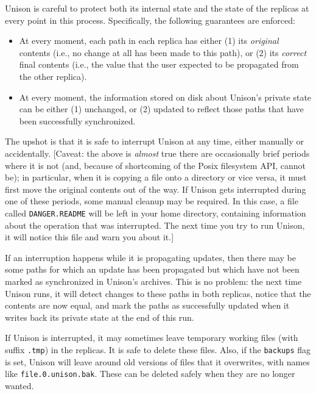 \documentclass{article}
\begin{document}

Unison is careful to protect both its internal state and the state of
the replicas at every point in this process.  Specifically, the
following guarantees are enforced:
\begin{itemize}
\item At every moment, each path in each replica has either (1) its {\em
  original} contents (i.e., no change at all has been made to this
path), or (2) its {\em correct} final contents (i.e., the value that the
user expected to be propagated from the other replica).
\item At every moment, the information stored on disk about Unison's
private state can be either (1) unchanged, or (2) updated to reflect
those paths that have been successfully synchronized.
\end{itemize}
The upshot is that it is safe to interrupt Unison at any time, either
manually or accidentally.  [Caveat: the above is {\em almost} true there
are occasionally brief periods where it is not (and, because of
shortcoming of the Posix filesystem API, cannot be); in particular, when
it is copying a file onto a directory or vice versa, it must first move
the original contents out of the way.  If Unison gets
interrupted during one of these periods, some manual cleanup may be
required.  In this case, a file called {\tt DANGER.README} will be left
in your home directory, containing information about the operation that
was interrupted. The next time you try to run Unison, it will notice this
file and warn you about it.]

If an interruption happens while it is propagating updates, then there
may be some paths for which an update has been propagated but which
have not been marked as synchronized in Unison's archives.  This is no
problem: the next time Unison runs, it will detect changes to these
paths in both replicas, notice that the contents are now equal, and
mark the paths as successfully updated when it writes back its private
state at the end of this run.

If Unison is interrupted, it may sometimes leave temporary working files
(with suffix \verb|.tmp|) in the replicas.  It is safe to delete these
files.  Also, if the \verb|backups| flag is set, Unison will
leave around old versions of files that it overwrites, with names like
\verb|file.0.unison.bak|.  These can be deleted safely when they are no
longer wanted.
\end{document}

